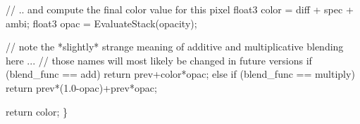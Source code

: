 \begin{DoxyCode}
  \textcolor{comment}{// .. and compute the final color value for this pixel}
  float3 color = diff + spec + ambi;
  float3 opac  = EvaluateStack(opacity);

  \textcolor{comment}{// note the *slightly* strange meaning of additive and multiplicative blending here ...}
  \textcolor{comment}{// those names will most likely be changed in future versions}
  \textcolor{keywordflow}{if} (blend\_func == add)
       \textcolor{keywordflow}{return} prev+color*opac;
  \textcolor{keywordflow}{else} \textcolor{keywordflow}{if} (blend\_func == multiply)
       \textcolor{keywordflow}{return} prev*(1.0-opac)+prev*opac;

   \textcolor{keywordflow}{return} color;
\}
\end{DoxyCode}
 